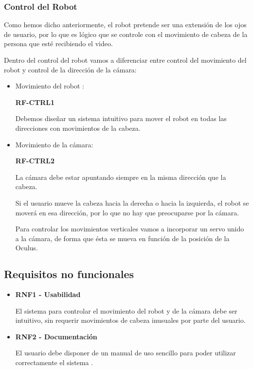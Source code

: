 \documentclass[twoside, 12pt]{epstfg}
\begin{document}
\subsubsection{Control del Robot}

Como hemos dicho anteriormente, el robot pretende ser una extensión de los ojos de usuario, por lo que es lógico que se controle con el movimiento de cabeza de la persona que esté recibiendo el video.

Dentro del control del robot vamos a diferenciar entre control del movimiento del robot y control de la dirección de la cámara:

\begin{itemize}
	\item Movimiento del robot :
	
	\textbf{RF-CTRL1}
	
	Debemos diseñar un sistema intuitivo para mover el robot en todas las direcciones con movimientos de la cabeza.
	\item  Movimiento de la cámara:
	
	\textbf{RF-CTRL2}
	
	La cámara debe estar apuntando siempre en la misma dirección que la cabeza.
	
	Si el usuario mueve la cabeza hacia la derecha o hacia la izquierda, el robot se moverá en esa dirección, por lo que no hay que preocuparse por la cámara.
	
	Para controlar los movimientos verticales vamos a incorporar un servo unido a la cámara, de forma que ésta se mueva en función de la posición de la Oculus. 
\end{itemize}


\subsection{Requisitos no funcionales}

\begin{itemize}
	\item \textbf{RNF1 - Usabilidad}
	
	
	El sistema para controlar el movimiento del robot y de la cámara debe ser intuitivo, sin requerir movimientos de cabeza inusuales por parte del usuario.
	
	
	
	\item \textbf{RNF2 - Documentación}
	
	El usuario debe disponer de un manual de uso sencillo para poder utilizar correctamente el sistema .
\end{itemize}
\end{document}

